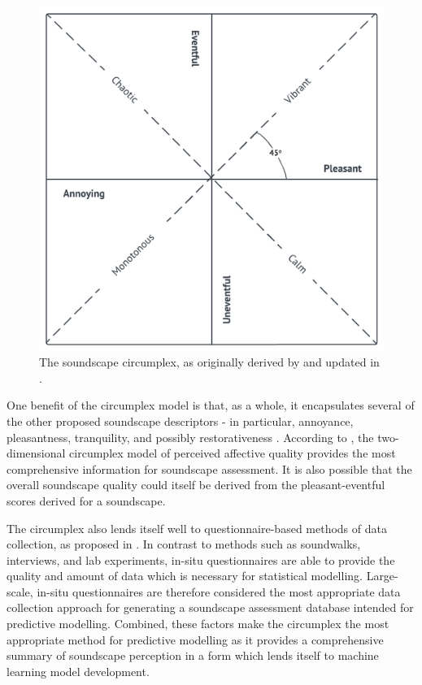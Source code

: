 \begin{figure}
  \centering
  \includegraphics{Figures/CircumplexOnly.png}
  \caption{The soundscape circumplex, as originally derived by \citet{Axelsson2010principal} and updated in \citet{ISO12913Part2}. \label{fig:circumplexOnly}}
\end{figure}

One benefit of the circumplex model is that, as a whole, it encapsulates several of the other proposed soundscape descriptors - in particular, annoyance, pleasantness, tranquility, and possibly restorativeness \citep{Aletta2016Soundscape}. According to \citet{Axelsson2015How}, the two-dimensional circumplex model of perceived affective quality provides the most comprehensive information for soundscape assessment. It is also possible that the overall soundscape quality could itself be derived from the pleasant-eventful scores derived for a soundscape.

The circumplex also lends itself well to questionnaire-based methods of data collection, as proposed in \citet{ISO12913Part2}. In contrast to methods such as soundwalks, interviews, and lab experiments, in-situ questionnaires are able to provide the quality and amount of data which is necessary for statistical modelling. Large-scale, in-situ questionnaires are therefore considered the most appropriate data collection approach for generating a soundscape assessment database intended for predictive modelling. Combined, these factors make the circumplex the most appropriate method for predictive modelling as it provides a comprehensive summary of soundscape perception in a form which lends itself to machine learning model development.

